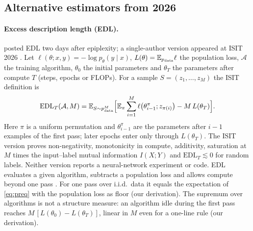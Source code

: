 \documentclass[11pt]{article}
\newcommand{\E}{\mathbb{E}}\newcommand{\N}{\mathbb{N}}\newcommand{\R}{\mathbb{R}}
\theoremstyle{tight}
\begin{document}
\subsection{Alternative estimators from 2026}\label{sec:alt}
\paragraph{Excess description length (EDL).} \citet{donoway2026edl} posted EDL two days after
epiplexity; a single-author version appeared at ISIT 2026 \citep{donoway2026edlisit}. Let
$\ell(\theta;x,y)=-\log p_\theta(y\mid x)$, $L(\theta)=\E_{p_{\rm data}}\ell$ the population loss,
$\mathcal A$ the training algorithm, $\theta_0$ the initial parameters and $\theta_T$ the parameters
after compute $T$ (steps, epochs or FLOPs). For a sample $S=(z_1,\dots,z_M)$ the ISIT definition is
\begin{equation}\label{eq:edl}
\mathrm{EDL}_T(\mathcal A,M)=\E_{S\sim p_{\rm data}^M}\Bigl[\E_\pi\sum_{i=1}^{M}
\ell\bigl(\theta^\pi_{i-1};z_{\pi(i)}\bigr)-M\,L(\theta_T)\Bigr].
\end{equation}
Here $\pi$ is a uniform permutation and $\theta^\pi_{i-1}$ are the parameters after $i-1$ examples of
the first pass; later epochs enter only through $L(\theta_T)$. The ISIT version proves non-negativity,
monotonicity in compute, additivity, saturation at $M$ times the input--label mutual information
$I(X;Y)$ and $\mathrm{EDL}_T\lesssim0$ for random labels. Neither version reports a neural-network experiment or code. EDL evaluates a given
algorithm, subtracts a population loss and allows compute beyond one pass
\citep{donoway2026edlisit}. For one pass over i.i.d.\ data it equals the expectation of
\eqref{eq:preq} with the population loss as floor (our derivation). The supremum over algorithms is
not a structure measure: an algorithm idle during the first pass reaches
$M\,[L(\theta_0)-L(\theta_T)]$, linear in $M$ even for a one-line rule (our derivation).
\end{document}
